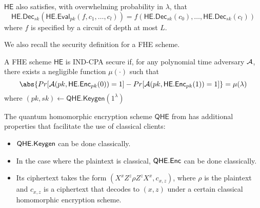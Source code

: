 $\mathsf{HE}$ also satisfies, with overwhelming probability in $\lambda$, that
$$\mathsf{HE.Dec}_{sk}(\mathsf{HE.Eval}_{pk}(f, c_1, \ldots, c_l))=f(\mathsf{HE.Dec}_{sk}(c_0),\ldots,\mathsf{HE.Dec}_{sk}(c_l))$$
where $f$ is specified by a circuit of depth at most $L$.


We also recall the security definition for a FHE scheme.

\begin{definition}
	A FHE scheme $\mathsf{HE}$ is IND-CPA secure if, for any polynomial time adversary $\mathcal{A}$, there exists a negligible function $\mu(\cdot)$ such that
	$$\abs{Pr[\cA(pk, \mathsf{HE.Enc}_{pk}(0))=1]-Pr[\cA(pk, \mathsf{HE.Enc}_{pk}(1))=1]}=\mu(\lambda)$$
	where $(pk, sk)\leftarrow\mathsf{QHE.Keygen}(1^\lambda)$
\end{definition}

The quantum homomorphic encryption scheme $\mathsf{QHE}$ from \cite{mahadev_qfhe} has additional properties that facilitate the use of classical clients:
\begin{itemize}
	\item $\mathsf{QHE.Keygen}$ can be done classically.
	\item In the case where the plaintext is classical, $\mathsf{QHE.Enc}$ can be done classically.
	\item Its ciphertext takes the form $(X^xZ^z\rho Z^zX^x, c_{x, z})$, where $\rho$ is the plaintext and $c_{x, z}$ is a ciphertext that decodes to $(x, z)$ under a certain classical homomorphic encryption scheme.
\end{itemize}

